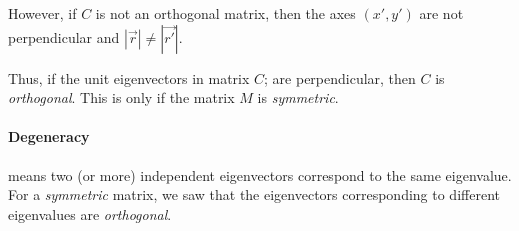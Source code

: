             \bulletpar However, if $C$ is not an orthogonal matrix, then the axes $(x', y')$ are not perpendicular and $|\vec{r}| \neq |\vec{r'}|$.
            
            \bulletpar Thus, if the unit eigenvectors in matrix $C$; are perpendicular, then $C$ is \textit{orthogonal}. This is only if the matrix $M$ is 
            \textit{symmetric}.

            \paragraph{Degeneracy} %
            \label{par:Degeneracy}
            means two (or more) independent eigenvectors correspond to the same eigenvalue.\\
            For a \textit{symmetric} matrix, we saw that the eigenvectors corresponding to different eigenvalues are \textit{orthogonal}.

